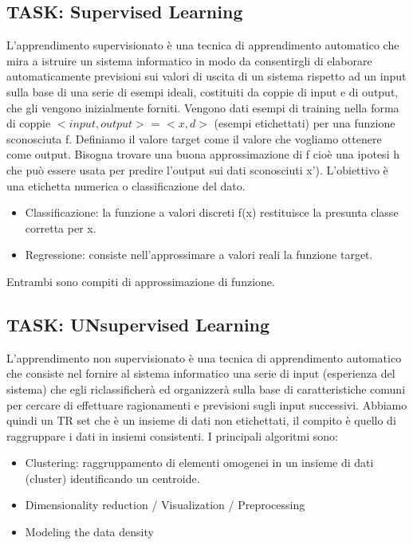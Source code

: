 \documentclass{article}
\begin{document}
\subsection{TASK: Supervised Learning}
L'apprendimento supervisionato è una tecnica di apprendimento automatico che mira a istruire un sistema informatico in modo da consentirgli di elaborare automaticamente previsioni sui valori di uscita di un sistema rispetto ad un input sulla base di una serie di esempi ideali, costituiti da coppie di input e di output, che gli vengono inizialmente forniti. \newline
Vengono dati esempi di training nella forma di coppie $<input,output>$ = $<x,d>$ (esempi etichettati) per una funzione sconosciuta f. Definiamo il valore target come il valore che vogliamo ottenere come output. \newline
Bisogna trovare una buona approssimazione di f cioè una ipotesi h che può essere usata per predire l'output sui dati sconosciuti x'). \newline
L'obiettivo è una etichetta numerica o classificazione del dato. 
\begin{itemize}
    \item Classificazione: la funzione a valori discreti f(x) restituisce la presunta classe corretta per x.
    \item Regressione: consiste nell'approssimare a valori reali la funzione target.
\end{itemize}
Entrambi sono compiti di approssimazione di funzione.

\subsection{TASK: UNsupervised Learning}
L'apprendimento non supervisionato è una tecnica di apprendimento automatico che consiste nel fornire al sistema informatico una serie di input (esperienza del sistema) che egli riclassificherà ed organizzerà sulla base di caratteristiche comuni per cercare di effettuare ragionamenti e previsioni sugli input successivi. Abbiamo quindi un TR set che è un insieme di dati non etichettati, il compito è quello di raggruppare i dati in insiemi consistenti. I principali algoritmi sono:
\begin{itemize}
    \item Clustering: raggruppamento di elementi omogenei in un insieme di dati (cluster) identificando un centroide.
    \item Dimensionality reduction / Visualization / Preprocessing
    \item Modeling the data density
\end{itemize}
\end{document}
